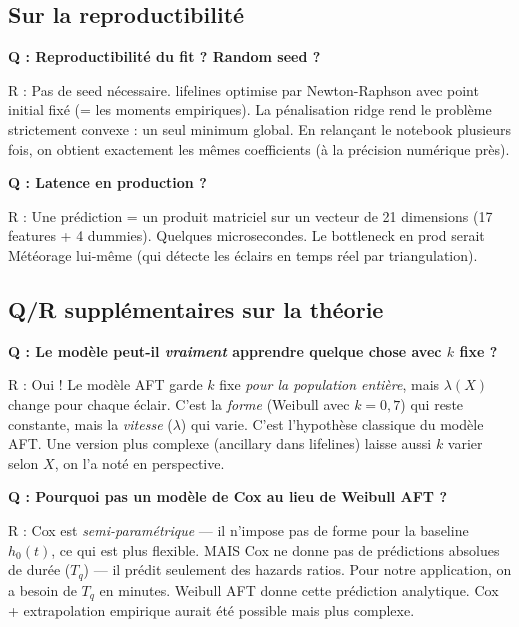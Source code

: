 \documentclass[11pt,a4paper]{article}
\begin{document}
\subsection*{Sur la reproductibilité}

\begin{piege}
\textbf{Q : Reproductibilité du fit ? Random seed ?}

R : Pas de seed nécessaire. lifelines optimise par Newton-Raphson avec point initial
fixé (= les moments empiriques). La pénalisation ridge rend le problème strictement
convexe : un seul minimum global. En relançant le notebook plusieurs fois, on obtient
exactement les mêmes coefficients (à la précision numérique près).
\end{piege}

\begin{piege}
\textbf{Q : Latence en production ?}

R : Une prédiction = un produit matriciel sur un vecteur de 21 dimensions (17 features
+ 4 dummies). Quelques microsecondes. Le bottleneck en prod serait Météorage lui-même
(qui détecte les éclairs en temps réel par triangulation).
\end{piege}

\subsection*{Q/R supplémentaires sur la théorie}

\begin{piege}
\textbf{Q : Le modèle peut-il \emph{vraiment} apprendre quelque chose avec $k$ fixe ?}

R : Oui ! Le modèle AFT garde $k$ fixe \emph{pour la population entière}, mais
$\lambda(X)$ change pour chaque éclair. C'est la \emph{forme} (Weibull avec $k = 0{,}7$)
qui reste constante, mais la \emph{vitesse} ($\lambda$) qui varie. C'est l'hypothèse
classique du modèle AFT. Une version plus complexe (\og ancillary \fg{} dans lifelines)
laisse aussi $k$ varier selon $X$, on l'a noté en perspective.
\end{piege}

\begin{piege}
\textbf{Q : Pourquoi pas un modèle de Cox au lieu de Weibull AFT ?}

R : Cox est \emph{semi-paramétrique} — il n'impose pas de forme pour la baseline $h_0(t)$,
ce qui est plus flexible. MAIS Cox ne donne pas de prédictions absolues de durée
($T_q$) — il prédit seulement des hazards ratios. Pour notre application, on a besoin de
$T_q$ en minutes. Weibull AFT donne cette prédiction analytique. Cox + extrapolation
empirique aurait été possible mais plus complexe.
\end{piege}
\end{document}
